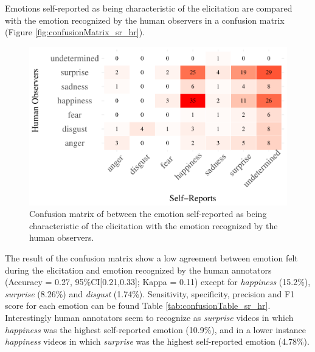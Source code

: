 \documentclass[conference,final,]{IEEEtran}
\makeatletter
\def\maxwidth{\ifdim\Gin@nat@width>\linewidth\linewidth
\else\Gin@nat@width\fi}
\let\Oldincludegraphics\includegraphics
\renewcommand{\includegraphics}[1]{\Oldincludegraphics[width=\maxwidth]{#1}}
\makeatother
\begin{document}
Emotions self-reported as being characteristic of the elicitation are
compared with the emotion recognized by the human observers in a
confusion matrix (Figure \ref{fig:confusionMatrix_sr_hr}).

\begin{figure}
\centering
\includegraphics{ACII_2019_paper_files/figure-latex/confusionMatrix_sr_hr-1.pdf}
\caption{Confusion matrix of between the emotion self-reported as being
characteristic of the elicitation with the emotion recognized by the
human observers.}
\end{figure}

The result of the confusion matrix show a low agreement between emotion
felt during the elicitation and emotion recognized by the human
annotators (Accuracy = 0.27, 95\%CI{[}0.21,0.33{]}; Kappa = 0.11) except
for \emph{happiness} (15.2\%), \emph{surprise} (8.26\%) and
\emph{disgust} (1.74\%). Sensitivity, specificity, precision and F1
score for each emotion can be found Table
\ref{tab:confusionTable_sr_hr}. Interestingly human annotators seem to
recognize as \emph{surprise} videos in which \emph{happiness} was the
highest self-reported emotion (10.9\%), and in a lower instance
\emph{happiness} videos in which \emph{surprise} was the highest
self-reported emotion (4.78\%).
\end{document}
